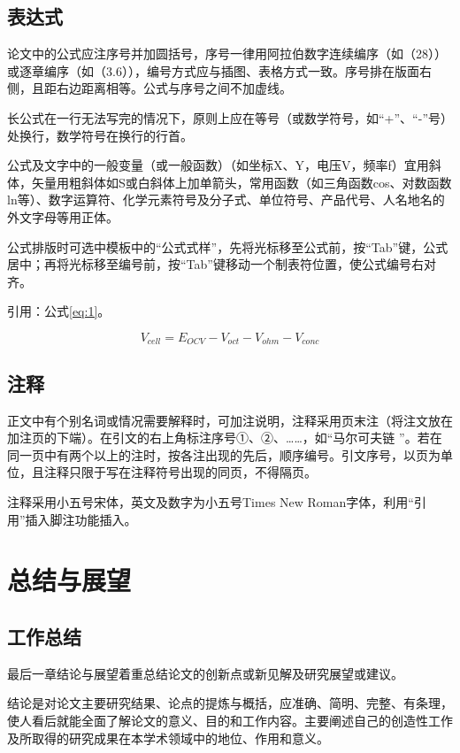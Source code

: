 \documentclass{seuthesis-2019}
\begin{document}
\section{表达式}
论文中的公式应注序号并加圆括号，序号一律用阿拉伯数字连续编序（如（28））或逐章编序（如（3.6）），编号方式应与插图、表格方式一致。序号排在版面右侧，且距右边距离相等。公式与序号之间不加虚线。

长公式在一行无法写完的情况下，原则上应在等号（或数学符号，如“+”、“-”号）处换行，数学符号在换行的行首。

公式及文字中的一般变量（或一般函数）（如坐标X、Y，电压V，频率f）宜用斜体，矢量用粗斜体如S或白斜体上加单箭头，常用函数（如三角函数cos、对数函数ln等）、数字运算符、化学元素符号及分子式、单位符号、产品代号、人名地名的外文字母等用正体。

公式排版时可选中模板中的“公式式样”，先将光标移至公式前，按“Tab”键，公式居中；再将光标移至编号前，按“Tab”键移动一个制表符位置，使公式编号右对齐。

引用：公式\eqref{eq:1}。

\begin{equation}\label{eq:1}
V_{cell}=E_{OCV}-V_{oct}-V_{ohm}-V_{conc}
\end{equation}
  
\section{注释}
正文中有个别名词或情况需要解释时，可加注说明，注释采用页末注（将注文放在加注页的下端）。在引文的右上角标注序号①、②、……，如“马尔可夫链 ”。若在同一页中有两个以上的注时，按各注出现的先后，顺序编号。引文序号，以页为单位，且注释只限于写在注释符号出现的同页，不得隔页。

注释采用小五号宋体，英文及数字为小五号Times New Roman字体，利用“引用”插入脚注功能插入。

\chapter{总结与展望}
\section{工作总结}
最后一章结论与展望着重总结论文的创新点或新见解及研究展望或建议。

结论是对论文主要研究结果、论点的提炼与概括，应准确、简明、完整、有条理，使人看后就能全面了解论文的意义、目的和工作内容。主要阐述自己的创造性工作及所取得的研究成果在本学术领域中的地位、作用和意义。
\end{document}
